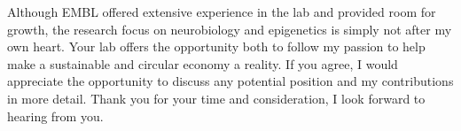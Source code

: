 \documentclass[11pt,a4paper,sans]{moderncv}
\begin{document}
\begin{spacing}{1.15}
Although EMBL offered extensive experience in the lab and provided room for growth, the research focus on neurobiology and epigenetics is simply not after my own heart.
Your lab offers the opportunity both to follow my passion to help make a sustainable and circular economy a reality. 
If you agree, I would appreciate the opportunity to discuss any potential position and my contributions in more detail. 
Thank you for your time and consideration, I look forward to hearing from you.

\end{spacing}
\makeletterclosing
\end{document}
